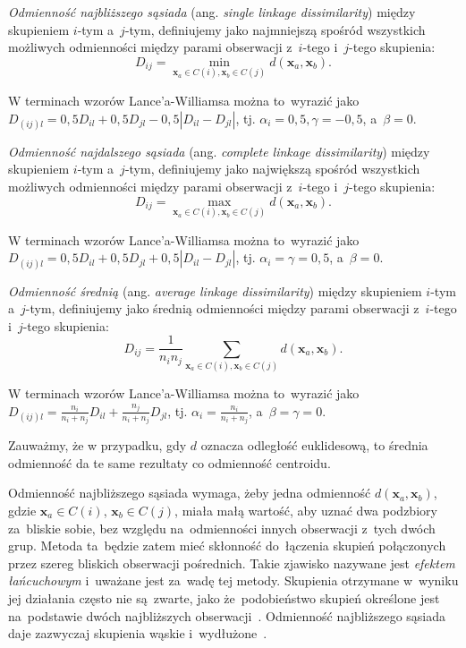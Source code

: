 \documentclass{praca1}
\begin{document}
\begin{definition}
\emph{Odmienność najbliższego sąsiada} (ang. \emph{single linkage dissimilarity}) między skupieniem $i$-tym a~$j$-tym, definiujemy jako najmniejszą spośród wszystkich możliwych odmienności między parami obserwacji z~$i$-tego i~$j$-tego skupienia:
$$
D_{ij} = \min\limits_{\mathbf{x}_a \in C(i), \mathbf{x}_b \in C(j)}d(\mathbf{x}_a, \mathbf{x}_b).
$$
\end{definition}

W terminach wzorów Lance'a-Williamsa można to~wyrazić jako $D_{(ij)l} = 0,5 D_{il} + 0,5 D_{jl} - 0,5 |D_{il} - D_{jl}| $, tj. $\alpha_i = 0,5, \gamma = -0,5$, a~$\beta = 0$.

\begin{definition}
\emph{Odmienność najdalszego sąsiada} (ang. \emph{complete linkage dissimilarity}) między skupieniem $i$-tym a~$j$-tym, definiujemy jako największą spośród wszystkich możliwych odmienności między parami obserwacji z~$i$-tego i~$j$-tego skupienia:
$$
D_{ij} = \max\limits_{\mathbf{x}_a \in C(i), \mathbf{x}_b \in C(j)}d(\mathbf{x}_a, \mathbf{x}_b).
$$
\end{definition}

W terminach wzorów Lance'a-Williamsa można to~wyrazić jako $D_{(ij)l} = 0,5 D_{il} + 0,5 D_{jl} + 0,5 |D_{il} - D_{jl}| $, tj. $\alpha_i = \gamma = 0,5$, a~$\beta = 0$.

\begin{definition}
\emph{Odmienność średnią} (ang. \emph{average linkage dissimilarity}) między skupieniem $i$-tym a~$j$-tym, definiujemy jako średnią odmienności między parami obserwacji z~$i$-tego i~$j$-tego skupienia:
$$
D_{ij} = \frac{1}{n_i n_j}\sum\limits_{\mathbf{x}_a \in C(i), \mathbf{x}_b \in C(j)}d(\mathbf{x}_a, \mathbf{x}_b).
$$
\end{definition}

W terminach wzorów Lance'a-Williamsa można to~wyrazić jako $D_{(ij)l} = \frac{n_i}{n_i+n_j} D_{il} + \frac{n_j}{n_i+n_j} D_{jl}$, tj. $\alpha_i = \frac{n_i}{n_i+n_j}$, a~$\beta = \gamma = 0$.

Zauważmy, że w przypadku, gdy $d$ oznacza odległość euklidesową, to średnia odmienność da te same rezultaty co odmienność centroidu.

Odmienność najbliższego sąsiada wymaga, żeby jedna odmienność $d(\mathbf{x}_a, \mathbf{x}_b)$, gdzie $\mathbf{x}_a \in C(i)$, $\mathbf{x}_b \in C(j)$, miała małą wartość, aby uznać dwa podzbiory za~bliskie sobie, bez względu na~odmienności innych obserwacji z~tych dwóch grup. Metoda ta~będzie zatem mieć skłonność do~łączenia skupień połączonych przez szereg bliskich obserwacji pośrednich. Takie zjawisko nazywane jest \emph{efektem łańcuchowym} i~uważane jest za~wadę tej metody. Skupienia otrzymane w~wyniku jej działania często nie są~zwarte, jako że~podobieństwo skupień określone jest na~podstawie dwóch najbliższych obserwacji~\cite{Hastie2009:elements}. Odmienność najbliższego sąsiada daje zazwyczaj skupienia wąskie i~wydłużone~\cite{Koronacki2005:statystyczne}. 
\end{document}
